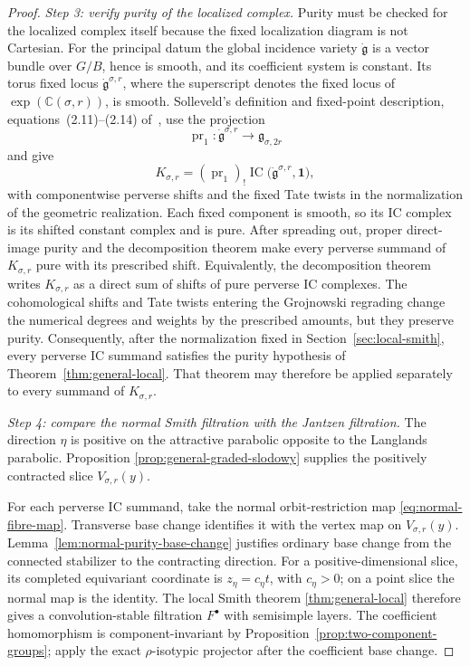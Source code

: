 \documentclass[11pt]{amsart}
\theoremstyle{definition}
\theoremstyle{remark}
\newcommand{\IC}{\operatorname{IC}}
\begin{document}
\begin{proof}
\smallskip
\noindent\emph{Step 3: verify purity of the localized complex.}
Purity must be checked for the localized complex itself because the fixed
localization diagram is not Cartesian.  For the principal datum the global
incidence variety $\dot{\mathfrak g}$ is a vector bundle over $G/B$, hence is
smooth, and its coefficient system is constant.  Its torus fixed locus
$\dot{\mathfrak g}^{\sigma,r}$, where the superscript denotes the fixed locus
of $\exp(\mathbb C(\sigma,r))$, is smooth.  Solleveld's definition and
fixed-point description, equations~(2.11)--(2.14) of~\cite{Solleveld}, use
the projection
\[
 \operatorname{pr}_1:\dot{\mathfrak g}^{\sigma,r}
 \longrightarrow\mathfrak g_{\sigma,2r}
\]
and give
\[
 K_{\sigma,r}=(\operatorname{pr}_1)_!
 \IC\bigl(\dot{\mathfrak g}^{\sigma,r},\mathbf1\bigr),
\]
with componentwise perverse shifts and the fixed Tate twists in the
normalization of the geometric realization.  Each fixed component is smooth,
so its IC
complex is its shifted constant complex and is pure.  After spreading out,
proper direct-image purity and the decomposition theorem
\cite[Stabilit\'es~5.1.14 and Th\'eor\`eme~5.4.5]{BBD} make every perverse summand of
$K_{\sigma,r}$ pure
with its prescribed shift.  Equivalently, the decomposition theorem writes
$K_{\sigma,r}$ as a direct sum of shifts of pure perverse IC complexes.
The cohomological shifts and Tate twists entering the Grojnowski regrading
change the numerical degrees and weights by the prescribed amounts, but they
preserve purity.  Consequently, after the normalization fixed in
Section~\ref{sec:local-smith}, every perverse IC summand satisfies the purity
hypothesis of Theorem~\ref{thm:general-local}.  That theorem may therefore be
applied separately to every summand of $K_{\sigma,r}$.

\smallskip
\noindent\emph{Step 4: compare the normal Smith filtration with the
Jantzen filtration.}
The direction $\eta$ is positive on the attractive parabolic opposite
to the Langlands parabolic.  Proposition
\ref{prop:general-graded-slodowy} supplies the positively contracted
slice $V_{\sigma,r}(y)$.

For each perverse IC summand, take the normal orbit-restriction map
\eqref{eq:normal-fibre-map}.  Transverse base change identifies it with
the vertex map on $V_{\sigma,r}(y)$.
Lemma~\ref{lem:normal-purity-base-change} justifies ordinary base change
from the connected stabilizer to the contracting direction.  For a
positive-dimensional slice, its completed equivariant coordinate is
$z_\eta=c_\eta t$, with $c_\eta>0$; on a point slice the normal map is
the identity.  The local Smith theorem
\ref{thm:general-local} therefore gives a convolution-stable filtration
$F^\bullet$ with semisimple layers.
The coefficient homomorphism is component-invariant by
Proposition~\ref{prop:two-component-groups}; apply the exact
$\rho$-isotypic projector after the coefficient base change.


\end{proof}
\end{document}
